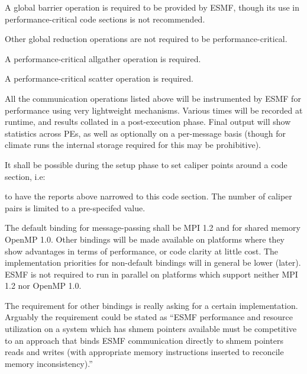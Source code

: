 A global barrier operation is required to be provided by ESMF, though
its use in performance-critical code sections is not recommended.


Other global reduction operations are not required to be performance-critical.


A performance-critical allgather operation is required.


A performance-critical scatter operation is required.


All the communication operations listed above will be instrumented by
ESMF for performance using very lightweight mechanisms. Various times
will be recorded at runtime, and results collated in a post-execution
phase. Final output will show statistics across PEs, as well as
optionally on a per-message basis (though for climate runs the
internal storage required for this may be prohibitive).



It shall be possible during the setup phase to set caliper points
around a code section, i.e:


to have the reports above narrowed to this code section. The number of
caliper pairs is limited to a pre-specifed value.



The default binding for message-passing shall be MPI 1.2 and for
shared memory OpenMP 1.0. Other bindings will be made available on
platforms where they show advantages in terms of performance, or code
clarity at little cost. The implementation priorities for non-default
bindings will in general be lower (later). ESMF is not required to run
in parallel on platforms which support neither MPI 1.2 nor OpenMP 1.0.

The requirement for other bindings is really asking for a certain
implementation. Arguably the requirement could be stated as ``ESMF
performance and resource utilization on a system which has shmem
pointers available must be competitive to an approach that binds ESMF
communication directly to shmem pointers reads and writes (with
appropriate memory instructions inserted to reconcile memory
inconsistency).''

